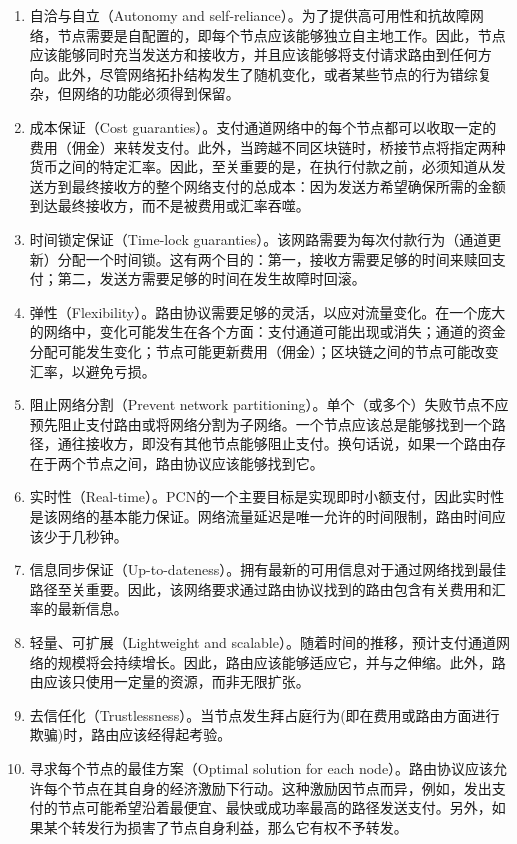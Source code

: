 \documentclass[12pt,a4paper]{article}
\begin{document}
\begin{enumerate}
	\item 自洽与自立（Autonomy and self-reliance）。为了提供高可用性和抗故障网络，节点需要是自配置的，即每个节点应该能够独立自主地工作。因此，节点应该能够同时充当发送方和接收方，并且应该能够将支付请求路由到任何方向。此外，尽管网络拓扑结构发生了随机变化，或者某些节点的行为错综复杂，但网络的功能必须得到保留。

	\item 成本保证（Cost guaranties）。支付通道网络中的每个节点都可以收取一定的费用（佣金）来转发支付。此外，当跨越不同区块链时，桥接节点将指定两种货币之间的特定汇率。因此，至关重要的是，在执行付款之前，必须知道从发送方到最终接收方的整个网络支付的总成本：因为发送方希望确保所需的金额到达最终接收方，而不是被费用或汇率吞噬。

	\item 时间锁定保证（Time-lock guaranties）。该网路需要为每次付款行为（通道更新）分配一个时间锁。这有两个目的：第一，接收方需要足够的时间来赎回支付；第二，发送方需要足够的时间在发生故障时回滚。

	\item 弹性（Flexibility）。路由协议需要足够的灵活，以应对流量变化。在一个庞大的网络中，变化可能发生在各个方面：支付通道可能出现或消失；通道的资金分配可能发生变化；节点可能更新费用（佣金）；区块链之间的节点可能改变汇率，以避免亏损。

	\item 阻止网络分割（Prevent network partitioning）。单个（或多个）失败节点不应预先阻止支付路由或将网络分割为子网络。一个节点应该总是能够找到一个路径，通往接收方，即没有其他节点能够阻止支付。换句话说，如果一个路由存在于两个节点之间，路由协议应该能够找到它。

	\item 实时性（Real-time）。PCN的一个主要目标是实现即时小额支付，因此实时性是该网络的基本能力保证。网络流量延迟是唯一允许的时间限制，路由时间应该少于几秒钟。

	\item 信息同步保证（Up-to-dateness）。拥有最新的可用信息对于通过网络找到最佳路径至关重要。因此，该网络要求通过路由协议找到的路由包含有关费用和汇率的最新信息。

	\item 轻量、可扩展（Lightweight and scalable）。随着时间的推移，预计支付通道网络的规模将会持续增长。因此，路由应该能够适应它，并与之伸缩。此外，路由应该只使用一定量的资源，而非无限扩张。

	\item 去信任化（Trustlessness）。当节点发生拜占庭行为(即在费用或路由方面进行欺骗)时，路由应该经得起考验。

	\item 寻求每个节点的最佳方案（Optimal solution for each node）。路由协议应该允许每个节点在其自身的经济激励下行动。这种激励因节点而异，例如，发出支付的节点可能希望沿着最便宜、最快或成功率最高的路径发送支付。另外，如果某个转发行为损害了节点自身利益，那么它有权不予转发。
\end{enumerate}
\end{document}
